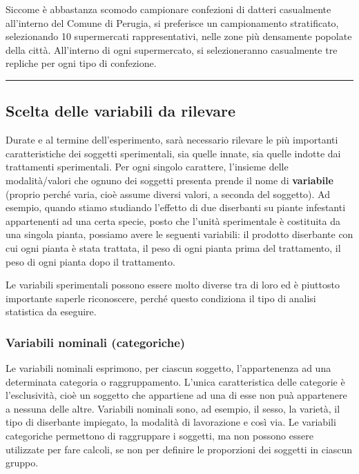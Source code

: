 \documentclass[a4paper,12pt,oneside]{book}
\begin{document}
Siccome è abbastanza scomodo campionare confezioni di datteri
casualmente all'interno del Comune di Perugia, si preferisce un
campionamento stratificato, selezionando 10 supermercati
rappresentativi, nelle zone più densamente popolate della città.
All'interno di ogni supermercato, si selezioneranno casualmente tre
repliche per ogni tipo di confezione.

\begin{center}\rule{0.5\linewidth}{\linethickness}\end{center}

\subsection{Scelta delle variabili da
rilevare}\label{scelta-delle-variabili-da-rilevare}

Durate e al termine dell'esperimento, sarà necessario rilevare le più
importanti caratteristiche dei soggetti sperimentali, sia quelle innate,
sia quelle indotte dai trattamenti sperimentali. Per ogni singolo
carattere, l'insieme delle modalità/valori che ognuno dei soggetti
presenta prende il nome di \textbf{variabile} (proprio perché varia,
cioè assume diversi valori, a seconda del soggetto). Ad esempio, quando
stiamo studiando l'effetto di due diserbanti su piante infestanti
appartenenti ad una certa specie, posto che l'unità sperimentale è
costituita da una singola pianta, possiamo avere le seguenti variabili:
il prodotto diserbante con cui ogni pianta è stata trattata, il peso di
ogni pianta prima del trattamento, il peso di ogni pianta dopo il
trattamento.

Le variabili sperimentali possono essere molto diverse tra di loro ed è
piuttosto importante saperle riconoscere, perché questo condiziona il
tipo di analisi statistica da eseguire.

\subsubsection{Variabili nominali
(categoriche)}\label{variabili-nominali-categoriche}

Le variabili nominali esprimono, per ciascun soggetto, l'appartenenza ad
una determinata categoria o raggruppamento. L'unica caratteristica delle
categorie è l'esclusività, cioè un soggetto che appartiene ad una di
esse non puà appartenere a nessuna delle altre. Variabili nominali sono,
ad esempio, il sesso, la varietà, il tipo di diserbante impiegato, la
modalità di lavorazione e così via. Le variabili categoriche permettono
di raggruppare i soggetti, ma non possono essere utilizzate per fare
calcoli, se non per definire le proporzioni dei soggetti in ciascun
gruppo.
\end{document}
